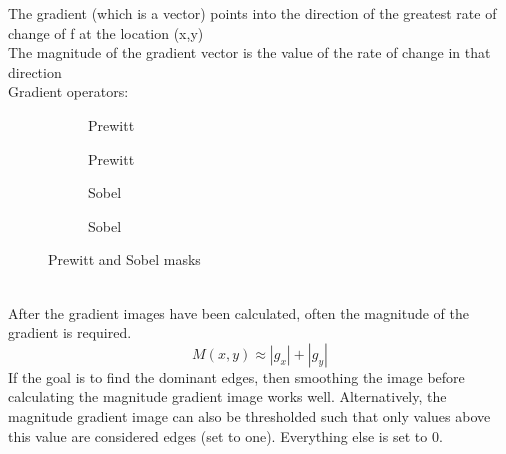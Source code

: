 The gradient (which is a vector) points into the direction of the greatest rate of change of f at the location (x,y)\\
The magnitude of the gradient vector is the value of the rate of change in that direction\\
Gradient operators:\\
\begin{figure}[h]
	\centering
	\begin{subfigure}[b]{0.2\textwidth}
		\centering
		\caption{Prewitt}
	\end{subfigure}
	\begin{subfigure}[b]{0.2\textwidth}
		\centering
		\caption{Prewitt}
	\end{subfigure}
	\begin{subfigure}[b]{0.2\textwidth}
		\centering
		\caption{Sobel}
	\end{subfigure}
	\begin{subfigure}[b]{0.2\textwidth}
		\centering
		\caption{Sobel}
	\end{subfigure}
	\caption{Prewitt and Sobel masks}
\end{figure}\\
After the gradient images have been calculated, often the magnitude of the gradient is required.
\[
	M(x,y) \approx |g_x|+|g_y|
\]
If the goal is to find the dominant edges, then smoothing the image before calculating the magnitude gradient image works well. Alternatively, the magnitude gradient image can also be thresholded such that only values above this value are considered edges (set to one). Everything else is set to 0.
